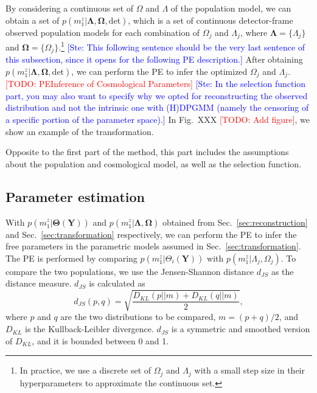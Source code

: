 \documentclass[aps,prd,twocolumn,superscriptaddress,preprintnumbers,nofootinbib,hidelinks]{revtex4-2}
\newcommand{\todo}[1]{\textcolor{red}{[TODO: #1]}}
\newcommand{\ste}[1]{\textcolor{blue}{[Ste: #1]}}
\begin{document}
By considering a continuous set of $\Omega$ and  $\Lambda$ of the population model, we can obtain a set of $p(m^z_1|\mathbf{\Lambda}, \mathbf{\Omega}, \mathrm{det})$, which is a set of continuous detector-frame observed population models for each combination of $\Omega_j$ and $\Lambda_j$, where $\mathbf{\Lambda} = \{\Lambda_j\}$ and $\mathbf{\Omega} = \{\Omega_j\}$.\footnote{In practice, we use a discrete set of $\Omega_j$ and $\Lambda_j$ with a small step size in their hyperparameters to approximate the continuous set.}
\ste{This following sentence should be the very last sentence of this subsection, since it opens for the following PE description.} 
After obtaining $p(m^z_1|\mathbf{\Lambda}, \mathbf{\Omega}, \mathrm{det})$, we can perform the \ac{PE} to infer the optimized $\Omega_j$ and $\Lambda_j$.
\todo{PE\textrightarrow Inference of Cosmological Parameters}
\ste{In the selection function part, you may also want to specify why we opted for reconstructing the observed distribution and not the intrinsic one with (H)DPGMM (namely the censoring of a specific portion of the parameter space).}
In Fig.~XXX \todo{Add figure}, we show an example of the transformation.

Opposite to the first part of the method, this part includes the assumptions about the population and cosmological model, as well as the selection function.

\subsection{Parameter estimation}
\label{sec:pe}

With $p(m^z_1|\mathbf{\Theta}(\mathbf{Y}))$ and $p(m^z_1|\mathbf{\Lambda}, \mathbf{\Omega})$ obtained from Sec.~\ref{sec:reconstruction} and Sec.~\ref{sec:transformation} respectively, we can perform the \ac{PE} to infer the free parameters in the parametric models assumed in Sec.~\ref{sec:transformation}.
The \ac{PE} is performed by comparing $p(m^z_1|\Theta_i(\mathbf{Y}))$ with $p(m^z_1|\Lambda_j, \Omega_j)$.
To compare the two populations, we use the Jensen-Shannon distance $d_{JS}$ as the distance measure.
$d_{JS}$ is calculated as
\begin{equation}
    d_{JS}(p, q) = \sqrt{\frac{D_{KL}(p||m) + D_{KL}(q||m)}{2}},
\end{equation}
where $p$ and $q$ are the two distributions to be compared, $m = (p + q) / 2$, and $D_{KL}$ is the Kullback-Leibler divergence.
$d_{JS}$ is a symmetric and smoothed version of $D_{KL}$, and it is bounded between 0 and 1.
\end{document}
